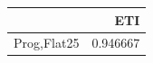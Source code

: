 \begin{tabular}{lr}
\toprule
 & ETI \\
\midrule
Prog,Flat25 & 0.946667 \\
\bottomrule
\end{tabular}
